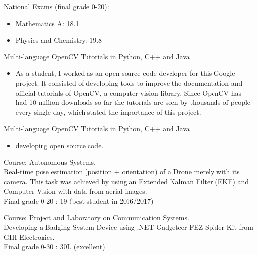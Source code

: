 \documentclass{article}
\begin{document}
\begin{llist}
 
National Exams (final grade 0-20):
\begin{itemize}
\item[\textendash] Mathematics A: 18.1
\item[\textendash] Physics and Chemistry: 19.8
\end{itemize}

{
}
{
}
\vspace{-0.33cm}

{
\href{https://summerofcode.withgoogle.com/archive/2016/projects/6414610965987328/}{Multi-language OpenCV Tutorials in Python, C++ and Java}
\vspace{-0.33cm}
\begin{itemize}
 \item[\textendash] As a student, I worked as an open source code developer for this Google project. It consisted of developing tools to improve the documentation and official tutorials of OpenCV, a computer vision library. Since OpenCV has had 10 million downloads so far the tutorials are seen by thousands of people every single day, which stated the importance of this project.
\end{itemize}
}
{
Multi-language OpenCV Tutorials in Python, C++ and Java
\vspace{-0.33cm}
\begin{itemize}
 \item developing open source code.
\end{itemize}
}

{
\vspace{-0.4cm}

 
Course: Autonomous Systems.\\
Real-time pose estimation (position + orientation) of a Drone merely with its camera. This task was achieved by using an Extended Kalman Filter (EKF) and Computer Vision with data from aerial images.\\
Final grade 0-20 : 19 (best student in 2016/2017)

 
Course: Project and Laboratory on Communication	Systems.\\
Developing a Badging System Device using .NET Gadgeteer FEZ Spider Kit from GHI Electronics.\\
Final grade 0-30 : 30L (excellent)

}
\end{llist}
\end{document}
